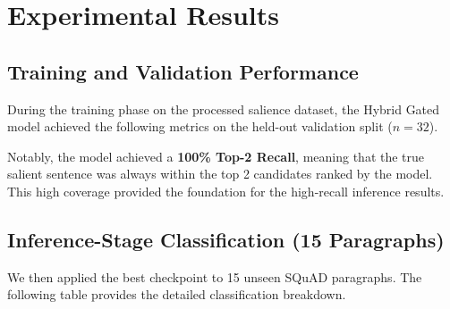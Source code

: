 \documentclass[11pt,a4paper]{article}
\begin{document}
\section{Experimental Results}

\subsection{Training and Validation Performance}
During the training phase on the processed salience dataset, the Hybrid Gated model achieved the following metrics on the held-out validation split ($n=32$). 

\begin{table}[h!]
\centering
{}
\caption{Classification performance on the training validation split. \textit{\scriptsize (Source: \texttt{shared/results/training\_metrics.json})}}
\end{table}

Notably, the model achieved a \textbf{100\% Top-2 Recall}, meaning that the true salient sentence was always within the top 2 candidates ranked by the model. This high coverage provided the foundation for the high-recall inference results.

\subsection{Inference-Stage Classification (15 Paragraphs)}
We then applied the best checkpoint to 15 unseen SQuAD paragraphs. The following table provides the detailed classification breakdown.

\begin{table}[h!]
\centering
{}
\caption{Impact of Gating on salient sentence identification. \textit{(Source: \texttt{hybrid\_eval\_report.json})}}
\label{tab:inference_results}
\end{table}
\end{document}
